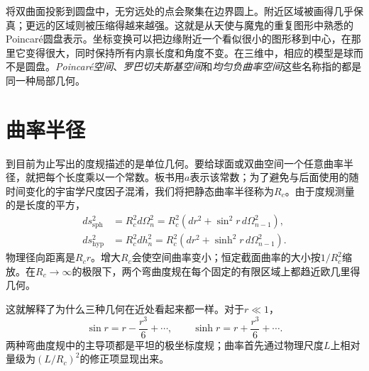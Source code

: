 将双曲面投影到圆盘中，无穷远处的点会聚集在边界圆上。附近区域被画得几乎保真；更远的区域则被压缩得越来越强。这就是从天使与魔鬼的重复图形中熟悉的Poincar\'e圆盘表示。坐标变换可以把边缘附近一个看似很小的图形移到中心，在那里它变得很大，同时保持所有内禀长度和角度不变。在三维中，相应的模型是球而不是圆盘。\emph{Poincar\'e空间}、\emph{罗巴切夫斯基空间}和\emph{均匀负曲率空间}这些名称指的都是同一种局部几何。

\begin{classroomqa}
\end{classroomqa}

\section{曲率半径}

到目前为止写出的度规描述的是单位几何。要给球面或双曲空间一个任意曲率半径，就把每个长度乘以一个常数。板书用\(a\)表示该常数；为了避免与后面使用的随时间变化的宇宙学尺度因子混淆，我们将把静态曲率半径称为\(R_c\)。由于度规测量的是长度的平方，
\begin{align}
ds_{\mathrm{sph}}^2
  &=R_c^2d\Omega_n^2
   =R_c^2\left(dr^2+\sin^2r\,d\Omega_{n-1}^2\right),\\
ds_{\mathrm{hyp}}^2
  &=R_c^2dh_n^2
   =R_c^2\left(dr^2+\sinh^2r\,d\Omega_{n-1}^2\right).
\label{eq:c03-scaled-curvature}
\end{align}
物理径向距离是\(R_cr\)。增大\(R_c\)会使空间曲率变小；恒定截面曲率的大小按\(1/R_c^2\)缩放。在\(R_c\to\infty\)的极限下，两个弯曲度规在每个固定的有限区域上都趋近欧几里得几何。

\begin{classroomqa}
\end{classroomqa}

这就解释了为什么三种几何在近处看起来都一样。对于\(r\ll1\)，
\begin{equation}
\sin r=r-\frac{r^3}{6}+\cdots,
\qquad
\sinh r=r+\frac{r^3}{6}+\cdots.
\end{equation}
两种弯曲度规中的主导项都是平坦的极坐标度规；曲率首先通过物理尺度\(L\)上相对量级为\((L/R_c)^2\)的修正项显现出来。

